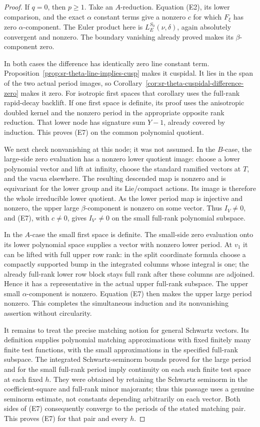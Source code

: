\begin{proof}
If \(q=0\), then \(p\ge1\). Take an \(A\)-reduction.
Equation (E2), its lower comparison, and the exact \(\alpha\)
constant terms give a nonzero \(c\) for which
\(F_\xi\) has zero \(\alpha\)-component.
The Euler product here is \(L_E^{S_0}(\nu,\delta)\), again
absolutely convergent and nonzero.
The boundary vanishing already proved makes its
\(\beta\)-component zero.

In both cases the difference has identically zero line
constant term. Proposition~\ref{prop:sr-theta-line-implies-cusp}
makes it cuspidal. It lies in the span of the two actual
period images, so
Corollary~\ref{cor:sr-theta-cuspidal-difference-zero} makes
it zero. For isotropic first spaces that corollary uses
the full-rank rapid-decay backlift. If one first space
is definite, its proof uses the anisotropic doubled
kernel and the nonzero period in the appropriate
opposite rank reduction. That lower node has signature
sum \(Y-1\), already covered by induction.
This proves (E7) on the common polynomial quotient.

We next check nonvanishing at this node; it was not assumed.
In the \(B\)-case, the large-side zero evaluation has a
nonzero lower quotient image: choose a lower polynomial
vector and lift at infinity, choose the standard ramified
vectors at \(T\), and the vacua elsewhere.
The resulting descended map is nonzero and is equivariant
for the lower group and its Lie/compact actions. Its image
is therefore the whole irreducible lower quotient.
As the lower period map is injective and nonzero,
the upper large \(\beta\)-component is nonzero on some vector.
Thus \(I_V\ne0\), and (E7), with \(c\ne0\), gives
\(I_{V'}\ne0\) on the small full-rank polynomial subspace.

In the \(A\)-case the small first space is definite.
The small-side zero evaluation onto its lower polynomial
space supplies a vector with nonzero lower period.
At \(v_1\) it can be lifted with full upper row rank:
in the split coordinate formula choose a compactly supported
bump in the integrated columns whose integral is one;
the already full-rank lower row block stays full rank after
these columns are adjoined. Hence it has a representative
in the actual upper full-rank subspace.
The upper small \(\alpha\)-component is nonzero.
Equation (E7) then makes the upper large period nonzero.
This completes the simultaneous induction and its
nonvanishing assertion without circularity.

It remains to treat the precise matching notion for general
Schwartz vectors. Its definition supplies polynomial matching
approximations with fixed finitely many finite test functions,
with the small approximations in the specified full-rank
subspace. The integrated Schwartz-seminorm bounds proved for
the large period and for the small full-rank period imply
continuity on each such finite test space at each fixed \(h\).
They were obtained by retaining the Schwartz seminorm in the
coefficient-square and full-rank minor majorants; thus this
passage uses a genuine seminorm estimate, not constants
depending arbitrarily on each vector.
Both sides of (E7) consequently converge to the periods of
the stated matching pair. This proves (E7) for that pair
and every \(h\).


\end{proof}

